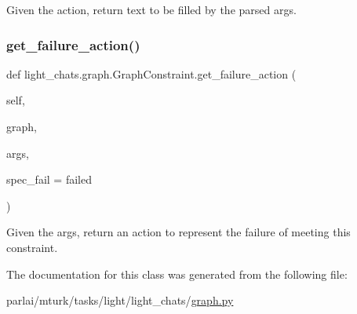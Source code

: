 \begin{DoxyVerb}Given the action, return text to be filled by the parsed args.
\end{DoxyVerb}
 \mbox{\label{classlight__chats_1_1graph_1_1GraphConstraint_ac824a43559c367bf625f79559f026c6b}} 
\subsubsection{\texorpdfstring{get\+\_\+failure\+\_\+action()}{get\_failure\_action()}}
{\footnotesize\ttfamily def light\+\_\+chats.\+graph.\+Graph\+Constraint.\+get\+\_\+failure\+\_\+action (\begin{DoxyParamCaption}\item[{}]{self,  }\item[{}]{graph,  }\item[{}]{args,  }\item[{}]{spec\+\_\+fail = {\ttfamily \textquotesingle{}failed\textquotesingle{}} }\end{DoxyParamCaption})}

\begin{DoxyVerb}Given the args, return an action to represent the failure of meeting this
constraint.
\end{DoxyVerb}
 

The documentation for this class was generated from the following file\+:\begin{DoxyCompactItemize}
\item 
parlai/mturk/tasks/light/light\+\_\+chats/\hyperlink{parlai_2mturk_2tasks_2light_2light__chats_2graph_8py}{graph.\+py}\end{DoxyCompactItemize}

